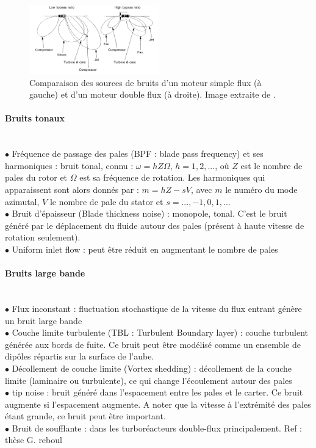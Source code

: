 \begin{figure}[!h]
 \begin{center}
  \includegraphics[width=0.5\textwidth]{img/smith_noise.png}
  \caption{Comparaison des sources de bruits d'un moteur simple flux (à gauche) et d'un moteur double flux (à droite). Image extraite de \cite{Smith1989}.\label{smith}}
 \end{center}
\end{figure}


\paragraph{Bruits tonaux}~\\
	$\bullet$ Fréquence de passage des pales (BPF : blade pass frequency) et ses harmoniques : bruit tonal, connu : $\omega = h Z \Omega$, $h=1,2,...$,  où $Z$ est le nombre de pales du rotor et $\Omega$ est sa fréquence de rotation. Les harmoniques qui apparaissent sont alors donnés par : $m=hZ-sV$, avec $m$ le numéro du mode azimutal, $V$ le nombre de pale du stator et $s=...,-1,0,1,...$\\
	$\bullet$ Bruit d'épaisseur (Blade thickness noise) : monopole, tonal. C'est le bruit généré par le déplacement du fluide autour des pales (présent à haute vitesse de rotation seulement).\\
	$\bullet$ Uniform inlet flow : peut être réduit en augmentant le nombre de pales\\

 

\paragraph{Bruits large bande}~\\
	$\bullet$ Flux inconstant : fluctuation stochastique de la vitesse du flux entrant génère un bruit large bande\\
		$\bullet$ Couche limite turbulente (TBL : Turbulent Boundary layer) : couche turbulent générée aux bords de fuite. Ce bruit peut être modélisé comme un ensemble de dipôles répartis sur la surface de l'aube.\\
	$\bullet$ Décollement de couche limite (Vortex shedding) : décollement de la couche limite (laminaire ou turbulente), ce qui change l'écoulement autour des pales\\
	$\bullet$ tip noise : bruit généré dans l'espacement entre les pales et le carter. Ce bruit augmente si l'espacement augmente. A noter que la vitesse à l'extrémité des pales étant grande, ce bruit peut être important.\\
	$\bullet$ Bruit de soufflante : dans les turboréacteurs double-flux principalement. Ref : thèse G. reboul\\


